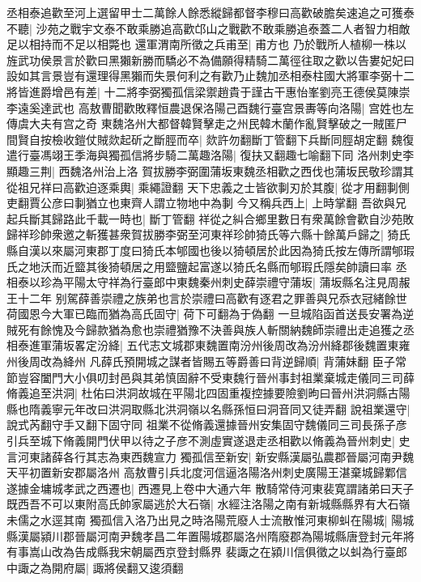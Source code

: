 丞相泰追歡至河上選留甲士二萬餘人餘悉縱歸都督李穆曰高歡破膽矣速追之可獲泰不聽|{
	沙苑之戰宇文泰不敢乘勝追高歡邙山之戰歡不敢乘勝追泰蓋二人者智力相敵足以相持而不足以相斃也}
還軍渭南所徵之兵甫至|{
	甫方也}
乃於戰所人植柳一株以旌武功侯景言於歡曰黑獺新勝而驕必不為備願得精騎二萬徑往取之歡以告婁妃妃曰設如其言景豈有還理得黑獺而失景何利之有歡乃止魏加丞相泰柱國大將軍李弼十二將皆進爵增邑有差|{
	十二將李弼獨孤信梁禦趙貴于謹古干惠怡峯劉亮王德侯莫陳崇李遠奚達武也}
高敖曹聞歡敗釋恒農退保洛陽己酉魏行臺宫景夀等向洛陽|{
	宫姓也左傳虞大夫有宫之奇}
東魏洛州大都督韓賢擊走之州民韓木蘭作亂賢擊破之一賊匿尸間賢自按檢收鎧仗賊欻起斫之斷脛而卒|{
	欻許勿翻斷丁管翻下兵斷同脛胡定翻}
魏復遣行臺馮翊王季海與獨孤信將步騎二萬趣洛陽|{
	復扶又翻趣七喻翻下同}
洛州刺史李顯趣三荆|{
	西魏洛州治上洛}
賀拔勝李弼圍蒲坂東魏丞相歡之西伐也蒲坂民敬珍謂其從祖兄祥曰高歡迫逐乘輿|{
	乘繩證翻}
天下忠義之士皆欲剚刃於其腹|{
	從才用翻剚側吏翻賈公彦曰剚猶立也東齊人謂立物地中為剚}
今又稱兵西上|{
	上時掌翻}
吾欲與兄起兵斷其歸路此千載一時也|{
	斷丁管翻}
祥從之糾合鄉里數日有衆萬餘會歡自沙苑敗歸祥珍帥衆邀之斬獲甚衆賀拔勝李弼至河東祥珍帥猗氏等六縣十餘萬戶歸之|{
	猗氏縣自漢以來屬河東郡丁度曰猗氏本郇國也後以猗頓居於此因為猗氏按左傳所謂郇瑕氏之地沃而近盬其後猗頓居之用盬鹽起富遂以猗氏名縣而郇瑕氏隱矣帥讀曰率}
丞相泰以珍為平陽太守祥為行臺郎中東魏秦州刺史薛崇禮守蒲坂|{
	蒲坂縣名注見周赧王十二年}
别駕薛善崇禮之族弟也言於崇禮曰高歡有逐君之罪善與兄忝衣冠緒餘世荷國恩今大軍已臨而猶為高氏固守|{
	荷下可翻為于偽翻}
一旦城陷函首送長安署為逆賊死有餘愧及今歸款猶為愈也崇禮猶豫不決善與族人斬關納魏師崇禮出走追獲之丞相泰進軍蒲坂畧定汾絳|{
	五代志文城郡東魏置南汾州後周改為汾州絳郡後魏置東雍州後周改為絳州}
凡薛氏預開城之謀者皆賜五等爵善曰背逆歸順|{
	背蒲妹翻}
臣子常節豈容闔門大小俱叨封邑與其弟慎固辭不受東魏行晉州事封祖業棄城走儀同三司薛脩義追至洪洞|{
	杜佑曰洪洞故城在平陽北四固重複控據要險劉昫曰晉州洪洞縣古陽縣也隋義寧元年改曰洪洞取縣北洪洞嶺以名縣孫恒曰洞音同又徒弄翻}
說祖業還守|{
	說式芮翻守手又翻下固守同}
祖業不從脩義還據晉州安集固守魏儀同三司長孫子彦引兵至城下脩義開門伏甲以待之子彦不測虛實遂退走丞相歡以脩義為晉州刺史|{
	史言河東諸薛各行其志為東西魏宣力}
獨孤信至新安|{
	新安縣漢屬弘農郡晉屬河南尹魏天平初置新安郡屬洛州}
高敖曹引兵北度河信逼洛陽洛州刺史廣陽王湛棄城歸鄴信遂據金墉城孝武之西遷也|{
	西遷見上卷中大通六年}
散騎常侍河東裴寛謂諸弟曰天子既西吾不可以東附高氏帥家屬逃於大石嶺|{
	水經注洛陽之南有新城縣縣界有大石嶺未儒之水逕其南}
獨孤信入洛乃出見之時洛陽荒廢人士流散惟河東柳虯在陽城|{
	陽城縣漢屬潁川郡晉屬河南尹魏孝昌二年置陽城郡屬洛州隋廢郡為陽城縣唐登封元年將有事嵩山改為告成縣我宋朝屬西京登封縣界}
裴諏之在潁川信俱徵之以虯為行臺郎中諏之為開府屬|{
	諏將侯翻又逡須翻}
